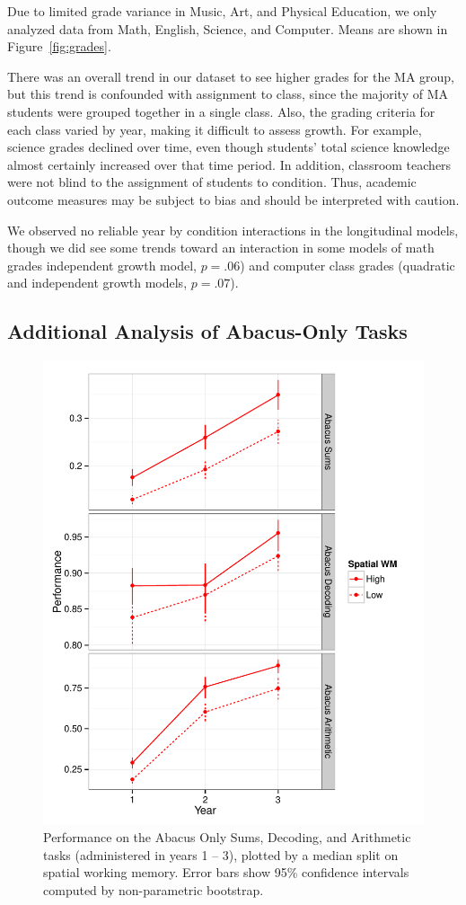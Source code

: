 \documentclass[11pt]{article}
\begin{document}
Due to limited grade variance in Music, Art, and Physical Education, we only analyzed data from Math, English, Science, and Computer. Means are shown in Figure~\ref{fig:grades}. 

There was an overall trend in our dataset to see higher grades for the MA group, but this trend is confounded with assignment to class, since the majority of MA students were grouped together in a single class. Also, the grading criteria for each class varied by year, making it difficult to assess growth. For example, science grades declined over time, even though students' total science knowledge almost certainly increased over that time period. In addition, classroom teachers were not blind to the assignment of students to condition. Thus, academic outcome measures may be subject to bias and should be interpreted with caution. 

We observed no reliable year by condition interactions in the longitudinal models, though we did see some trends toward an interaction in some models of math grades independent growth model, $p = .06$) and computer class grades (quadratic and independent growth models, $p = .07$). 
 
\subsection{Additional Analysis of Abacus-Only Tasks}

\begin{figure}
\begin{center}
\includegraphics[width=4.5in]{figures/abacus_by_swm.pdf}
\end{center}
\caption{Performance on the Abacus Only Sums, Decoding, and Arithmetic tasks (administered in years 1 -- 3), plotted by a median split on spatial working memory. Error bars show 95\% confidence intervals computed by non-parametric bootstrap.}
\label{fig:abacusonly}
\end{figure}
\end{document}
